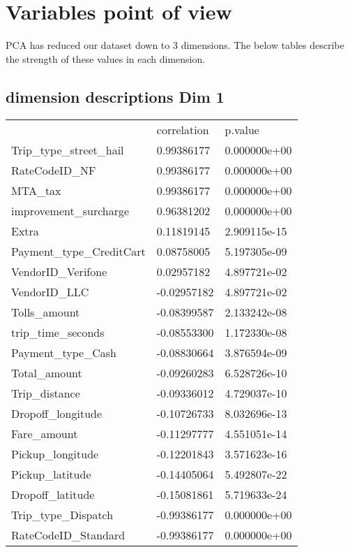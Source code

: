 \documentclass{article}
\begin{document}
\section{Variables point of view}
PCA has reduced our dataset down to 3 dimensions. The below tables describe the strength of these values in each dimension.

\subsection{dimension descriptions Dim 1}
\label{my-label}
\begin{tabular}{lll}
& correlation   &   p.value \\
Trip\_type\_street\_hail   &  0.99386177 &  0.000000e+00 \\
RateCodeID\_NF           &  0.99386177 &  0.000000e+00 \\
MTA\_tax                 &  0.99386177 &  0.000000e+00 \\
improvement\_surcharge   &  0.96381202 &  0.000000e+00 \\
Extra                   &  0.11819145 & 2.909115e-15 \\
Payment\_type\_CreditCart &  0.08758005 & 5.197305e-09 \\
VendorID\_Verifone       &  0.02957182 & 4.897721e-02 \\
VendorID\_LLC            & -0.02957182 & 4.897721e-02 \\
Tolls\_amount            & -0.08399587 & 2.133242e-08 \\
trip\_time\_seconds       & -0.08553300 & 1.172330e-08 \\
Payment\_type\_Cash       & -0.08830664 & 3.876594e-09 \\
Total\_amount            & -0.09260283 & 6.528726e-10 \\
Trip\_distance           & -0.09336012 & 4.729037e-10 \\
Dropoff\_longitude       & -0.10726733 & 8.032696e-13 \\
Fare\_amount             & -0.11297777 & 4.551051e-14 \\
Pickup\_longitude        & -0.12201843 & 3.571623e-16 \\
Pickup\_latitude         & -0.14405064 & 5.492807e-22 \\
Dropoff\_latitude        & -0.15081861 & 5.719633e-24 \\
Trip\_type\_Dispatch      & -0.99386177&  0.000000e+00 \\
RateCodeID\_Standard     & -0.99386177&  0.000000e+00
\end{tabular}
\end{document}
